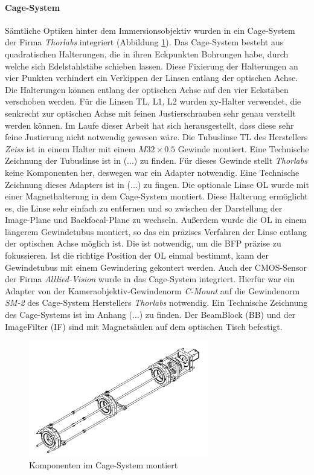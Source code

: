 \documentclass{article}
\begin{document}
		\paragraph{Cage-System}
			Sämtliche Optiken hinter dem Immersionsobjektiv wurden in ein Cage-System der Firma \textit{Thorlabs} integriert (Abbildung \ref{fig:cage_system}). Das Cage-System besteht aus quadratischen Halterungen, die in ihren Eckpunkten Bohrungen habe, durch welche sich Edelstahlstäbe schieben lassen. Diese Fixierung der Halterungen an vier Punkten verhindert ein Verkippen der Linsen entlang der optischen Achse. Die Halterungen können entlang der optischen Achse auf den vier Eckstäben verschoben werden. Für die  Linsen TL, L1, L2 wurden xy-Halter verwendet, die senkrecht zur optischen Achse mit feinen Justierschrauben sehr genau verstellt werden können. Im Laufe dieser Arbeit hat sich herausgestellt, dass diese sehr feine Justierung nicht notwendig gewesen wäre. Die Tubuslinse TL des Herstellers \textit{Zeiss} ist in einem Halter mit einem $M32\times0.5$ Gewinde montiert. Eine Technische Zeichnung der Tubuslinse ist in (...) zu finden. Für dieses Gewinde stellt \textit{Thorlabs} keine Komponenten her, deswegen war ein Adapter notwendig. Eine Technische Zeichnung dieses Adapters ist in (...) zu fingen. Die optionale Linse OL wurde mit einer Magnethalterung in dem Cage-System montiert. Diese Halterung ermöglicht es, die Linse sehr einfach zu entfernen und so zwischen der Darstellung der Image-Plane und Backfocal-Plane zu wechseln. Außerdem wurde die OL in einem längerem Gewindetubus montiert, so das ein präzises Verfahren der Linse entlang der optischen Achse möglich ist. Die ist notwendig, um die BFP präzise zu fokussieren. Ist die richtige Position der OL einmal bestimmt, kann der Gewindetubus mit einem Gewindering gekontert werden. Auch der CMOS-Sensor der Firma \textit{Alllied-Vision} wurde in das Cage-System integriert. Hierfür war ein Adapter von der Kameraobjektiv-Gewindenorm \textit{C-Mount} auf die Gewindenorm \textit{SM-2} des Cage-System Herstellers \textit{Thorlabs} notwendig. Ein Technische Zeichnung des Cage-Systems ist im Anhang (...) zu finden. Der BeamBlock (BB) und der ImageFilter (IF) sind mit Magnetsäulen auf dem optischen Tisch befestigt.
			\begin{figure}[htbp] 
				\centering
				\includegraphics[width=0.7\textwidth]{figures/Cage_System.pdf}
				\caption{Komponenten im Cage-System montiert}
				\label{fig:cage_system}
			\end{figure}	
\end{document}
